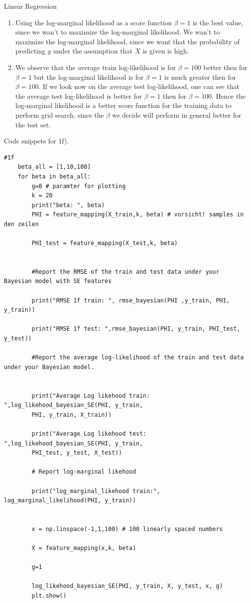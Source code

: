 \begin{task}{Linear Regression}
\begin{subtask}
\begin{enumerate}
\begin{enumerate}
\begin{center}
\end{center}
\end{enumerate}
\item Using the log-marginal likelihood as a score function $\beta=1$ is the best value, since we wan't to maximize the log-marginal likelihood. We wan't to maximize the log-marginal likelihood, since we want that the probability of predicting $y$ under the assumption that $X$ is given is high. 
\item We observe that the average train log-likelihood is for $\beta=100$ better then for $\beta=1$ but the log-marginal likelihood is for $\beta=1$ is much greater then for $\beta=100$. If we look now on the average test log-likelihood, one can see that the average test log-likelihood is better for $\beta=1$ then for $\beta=100$. Hence the log-marginal likelihood is a better score function for the training data to perform grid search, since the $\beta$ we decide will perform in general better for the test set. 
\end{enumerate}
Code snippets for 1f).
\begin{lstlisting}
#1f
    beta_all = [1,10,100]
    for beta in beta_all:
        g=0 # paramter for plotting
        k = 20
        print("beta: ", beta)
        PHI = feature_mapping(X_train,k, beta) # vorsicht! samples in den zeilen
    
        PHI_test = feature_mapping(X_test,k, beta)
    
        
        #Report the RMSE of the train and test data under your Bayesian model with SE features
        
        print("RMSE 1f train: ", rmse_bayesian(PHI ,y_train, PHI, y_train))
        
        print("RMSE 1f test: ",rmse_bayesian(PHI, y_train, PHI_test, y_test))
        
        #Report the average log-likelihood of the train and test data under your Bayesian model.
        
        
        print("Average Log likehood train: ",log_likehood_bayesian_SE(PHI, y_train, 
        PHI, y_train, X_train))
        
        print("Average Log likehood test: ",log_likehood_bayesian_SE(PHI, y_train, 
        PHI_test, y_test, X_test))
        
        # Report log-marginal likehood
        
        print("log_marginal_likehood train:", log_marginal_likelihood(PHI, y_train))
        
        
        x = np.linspace(-1,1,100) # 100 linearly spaced numbers
        
        X = feature_mapping(x,k, beta)
        
        g=1
        
        log_likehood_bayesian_SE(PHI, y_train, X, y_test, x, g)
        plt.show()
\end{lstlisting}
\end{subtask}
\end{task}